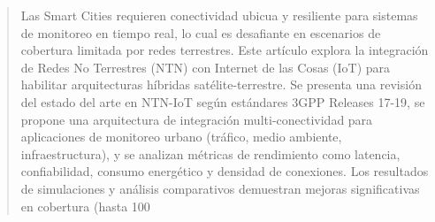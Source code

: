 \begin{abstract}
Las Smart Cities requieren conectividad ubicua y resiliente para sistemas de monitoreo en tiempo real, lo cual es desafiante en escenarios de cobertura limitada por redes terrestres. Este artículo explora la integración de Redes No Terrestres (NTN) con Internet de las Cosas (IoT) para habilitar arquitecturas híbridas satélite-terrestre. Se presenta una revisión del estado del arte en NTN-IoT según estándares 3GPP Releases 17-19, se propone una arquitectura de integración multi-conectividad para aplicaciones de monitoreo urbano (tráfico, medio ambiente, infraestructura), y se analizan métricas de rendimiento como latencia, confiabilidad, consumo energético y densidad de conexiones. Los resultados de simulaciones y análisis comparativos demuestran mejoras significativas en cobertura (hasta 100%
\end{abstract}